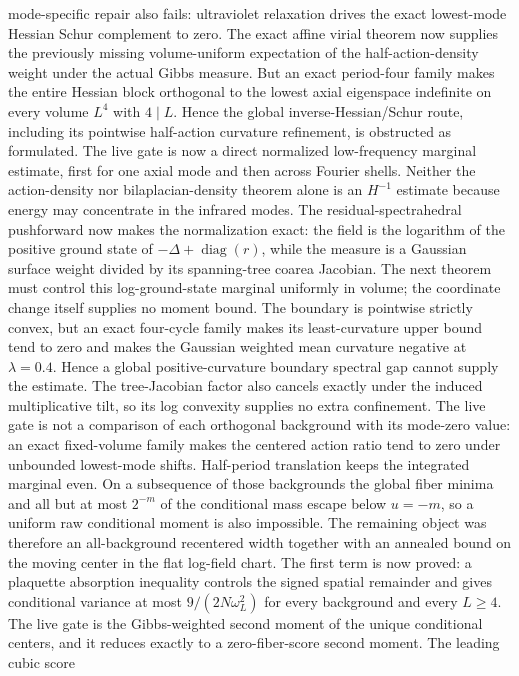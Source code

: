 \documentclass[11pt]{article}
\theoremstyle{definition}
\theoremstyle{remark}
\begin{document}
mode-specific repair also fails: ultraviolet relaxation drives the exact
lowest-mode Hessian Schur complement to zero.  The exact affine virial theorem
now supplies the previously missing volume-uniform expectation of the
half-action-density weight under the actual Gibbs measure.  But an exact
period-four family makes the entire Hessian block orthogonal to the lowest
axial eigenspace indefinite on every volume \(L^4\) with \(4\mid L\).  Hence
the global inverse-Hessian/Schur route, including its pointwise half-action
curvature refinement, is obstructed as formulated.  The live gate is now a
direct normalized low-frequency marginal estimate, first for one axial mode
and then across Fourier shells.  Neither the action-density nor
bilaplacian-density theorem alone is an \(H^{-1}\) estimate because energy may
concentrate in the infrared modes.
The residual-spectrahedral pushforward now makes the normalization exact: the
field is the logarithm of the positive ground state of
\(-\Delta+\operatorname{diag}(r)\), while the measure is a Gaussian surface
weight divided by its spanning-tree coarea Jacobian.  The next theorem must
control this log-ground-state marginal uniformly in volume; the coordinate
change itself supplies no moment bound.
The boundary is pointwise strictly convex, but an exact four-cycle family
makes its least-curvature upper bound tend to zero and makes the Gaussian
weighted mean curvature negative at \(\lambda=0.4\).  Hence a global
positive-curvature boundary spectral gap cannot supply the estimate.  The
tree-Jacobian factor also cancels exactly under the induced multiplicative
tilt, so its log convexity supplies no extra confinement.  The live gate is
not a comparison of each orthogonal background with its mode-zero value: an
exact fixed-volume family makes the centered action ratio tend to zero under
unbounded lowest-mode shifts.  Half-period translation keeps the integrated
marginal even.  On a subsequence of those backgrounds the global fiber minima
and all but at most $2^{-m}$ of the conditional mass escape below $u=-m$,
so a uniform raw conditional moment is also impossible.  The remaining object
was therefore an all-background recentered width together with an annealed
bound on the moving center in the flat log-field chart.  The first term is now
proved: a plaquette absorption inequality controls the signed spatial
remainder and gives conditional variance at most
$9/(2N\omega_L^2)$ for every background and every $L\geq4$.  The live gate is
the Gibbs-weighted second moment of the unique conditional centers, and it
reduces exactly to a zero-fiber-score second moment.  The leading cubic score
\end{document}
